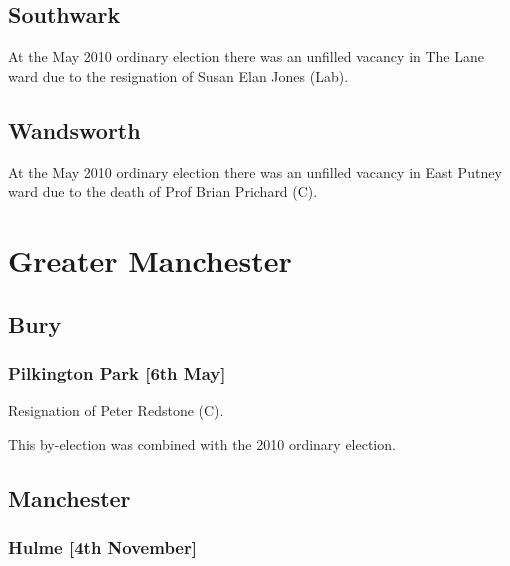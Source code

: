\begin{resultsiii}
\subsection{Southwark}

At the May 2010 ordinary election there was an unfilled vacancy in The Lane ward due to the resignation of Susan Elan Jones (Lab).

\subsection{Wandsworth}

At the May 2010 ordinary election there was an unfilled vacancy in East Putney ward due to the death of Prof Brian Prichard (C).

\section{Greater Manchester}

\subsection{Bury}

\subsubsection*{Pilkington Park \hspace*{\fill}\nolinebreak[1]%
\enspace\hspace*{\fill}
[6th May]}


Resignation of Peter Redstone (C).

This by-election was combined with the 2010 ordinary election.

\subsection{Manchester}

\subsubsection*{Hulme \hspace*{\fill}\nolinebreak[1]%
\enspace\hspace*{\fill}
[4th November]}


\end{resultsiii}
